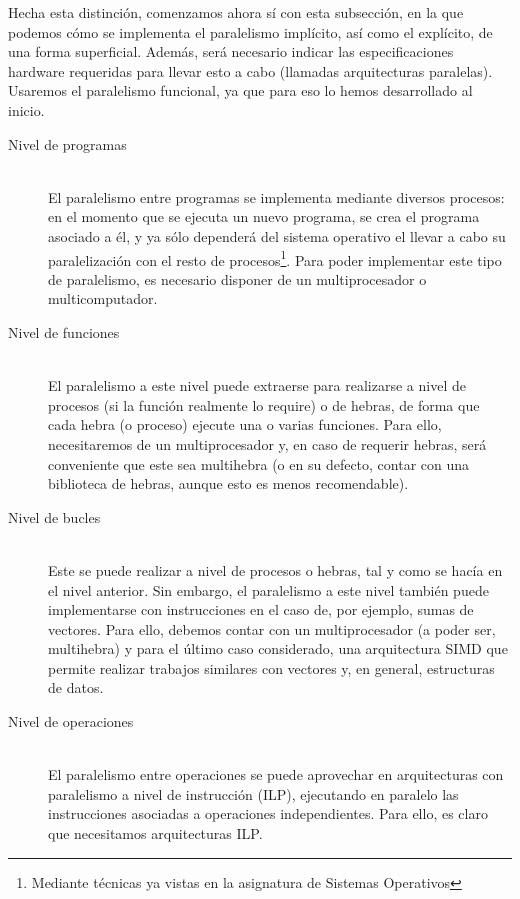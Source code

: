Hecha esta distinción, comenzamos ahora sí con esta subsección, en la que podemos cómo se implementa el paralelismo implícito, así como el explícito, de una forma superficial. Además, será necesario indicar las especificaciones hardware requeridas para llevar esto a cabo (llamadas arquitecturas paralelas). Usaremos el paralelismo funcional, ya que para eso lo hemos desarrollado al inicio.
\begin{description}
    \item [Nivel de programas]~\\
        El paralelismo entre programas se implementa mediante diversos procesos: en el momento que se ejecuta un nuevo programa, se crea el programa asociado a él, y ya sólo dependerá del sistema operativo el llevar a cabo su paralelización con el resto de procesos\footnote{Mediante técnicas ya vistas en la asignatura de Sistemas Operativos}. Para poder implementar este tipo de paralelismo, es necesario disponer de un multiprocesador o multicomputador.

    \item [Nivel de funciones]~\\
        El paralelismo a este nivel puede extraerse para realizarse a nivel de procesos (si la función realmente lo require) o de hebras, de forma que cada hebra (o proceso) ejecute una o varias funciones. Para ello, necesitaremos de un multiprocesador y, en caso de requerir hebras, será conveniente que este sea multihebra (o en su defecto, contar con una biblioteca de hebras, aunque esto es menos recomendable).

    \item [Nivel de bucles]~\\
        Este se puede realizar a nivel de procesos o hebras, tal y como se hacía en el nivel anterior. Sin embargo, el paralelismo a este nivel también puede implementarse con instrucciones en el caso de, por ejemplo, sumas de vectores. Para ello, debemos contar con un multiprocesador (a poder ser, multihebra) y para el último caso considerado, una arquitectura SIMD que permite realizar trabajos similares con vectores y, en general, estructuras de datos.

    \item [Nivel de operaciones]~\\
        El paralelismo entre operaciones se puede aprovechar en arquitecturas con paralelismo a nivel de instrucción (ILP), ejecutando en paralelo las instrucciones asociadas a operaciones independientes. Para ello, es claro que necesitamos arquitecturas ILP.
\end{description}


